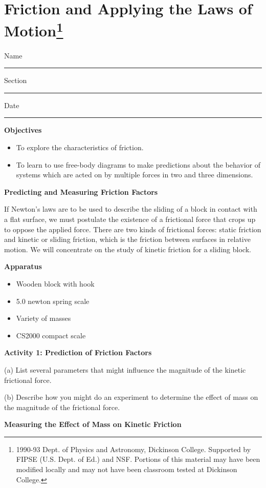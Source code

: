 
\section{Friction and Applying the Laws of Motion\footnote{
1990-93 Dept. of Physics and Astronomy, Dickinson College. Supported by FIPSE
(U.S. Dept. of Ed.) and NSF. Portions of this material may have been modified
locally and may not have been classroom tested at Dickinson College.
}}

Name \rule{2.0in}{0.1pt}\hfill{}Section \rule{1.0in}{0.1pt}\hfill{}Date \rule{1.0in}{0.1pt}

\textbf{Objectives }

\begin{itemize}
\item To explore the characteristics of friction. 
\item To learn to use free-body diagrams to make predictions about the behavior of
systems which are acted on by multiple forces in two and three dimensions.
\end{itemize}
\textbf{Predicting and Measuring Friction Factors }

If Newton's laws are to be used to describe the sliding of a block in contact
with a flat surface, we must postulate the existence of a 
frictional
force that crops up to oppose the applied force. There are two kinds of frictional
forces: static friction and kinetic or sliding friction, which is the friction
between surfaces in relative motion. We will concentrate on the study of kinetic
friction for a sliding block.

\textbf{Apparatus }

\begin{itemize}
\item Wooden block with hook 
\item 5.0 newton spring scale 
\item Variety of masses 
\item CS2000 compact scale
\end{itemize}
\textbf{Activity 1: Prediction of Friction Factors }

(a) List several parameters that might influence the magnitude of the kinetic
frictional force.
\vspace{20mm}

(b) Describe how you might do an experiment to determine the effect of mass
on the magnitude of the frictional force.
\vspace{20mm}

\textbf{Measuring the Effect of Mass on Kinetic Friction }

